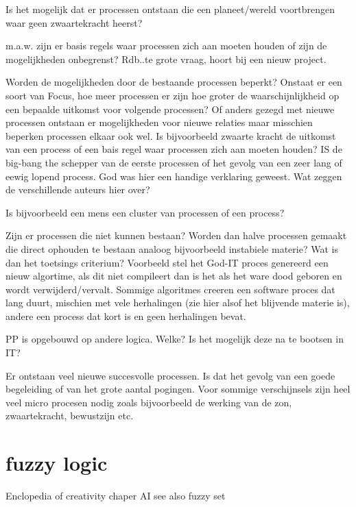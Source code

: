 \documentclass[a4paper]{Thesis}
\begin{document}
Is het mogelijk dat er processen ontstaan die een planeet/wereld voortbrengen waar geen zwaartekracht heerst?

m.a.w. zijn er basis regels waar processen zich aan moeten houden of zijn de mogelijkheden onbegrenst? 
Rdb..te grote vraag, hoort bij een nieuw project.

Worden de mogelijkheden door de bestaande processen beperkt? Onstaat er een soort van Focus, hoe meer processen er zijn hoe groter de waarschijnlijkheid op een bepaalde uitkomst voor volgende processen? Of anders gezegd met nieuwe processen ontstaan er mogelijkheden voor nieuwe relaties maar misschien beperken processen elkaar ook wel.
Is bijvoorbeeld zwaarte kracht de uitkomst van een process of een bais regel waar processen zich aan moeten houden?
IS de big-bang the schepper van de eerste processen of het gevolg van een zeer lang of eewig lopend process. God was hier een handige verklaring geweest.
Wat zeggen de verschillende auteurs hier over?

Is bijvoorbeeld een mens een cluster van processen of een process?

Zijn er processen die niet kunnen bestaan? Worden dan halve processen gemaakt die direct ophouden te bestaan analoog bijvoorbeeld instabiele materie?
Wat is dan het toetsings criterium? Voorbeeld stel het God-IT proces genereerd een nieuw algortime, als dit niet compileert dan is het als het ware dood geboren en wordt verwijderd/vervalt. Sommige algoritmes creeren een software proces dat lang duurt, mischien met vele herhalingen (zie hier alsof het blijvende materie is), andere een process dat kort is en geen herhalingen bevat.

PP is opgebouwd op andere logica. Welke? Is het mogelijk deze na te bootsen in IT?

Er ontstaan veel nieuwe succesvolle processen. Is dat het gevolg van een goede begeleiding of van het grote aantal pogingen. Voor sommige verschijnsels zijn heel veel micro procesen nodig zoals bijvoorbeeld de werking van de zon, zwaartekracht, bewustzijn etc.

\section{fuzzy logic}
Enclopedia of creativity chaper AI
see also fuzzy set
\end{document}
